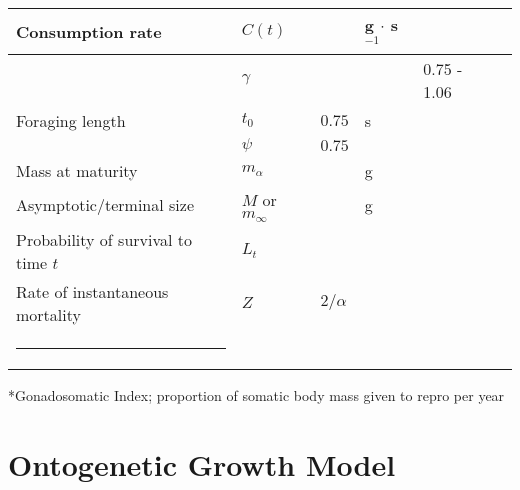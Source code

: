 \documentclass[a4paper]{article} %
\makeatletter
\newcommand{\thickhline}{%
    \noalign {\ifnum 0=`}\fi \hrule height 1pt
    \futurelet \reserved@a \@xhline
}
\makeatother
\begin{document}
\begin{table}[H]
\begin{tabularx}{\linewidth}{Xlllll}
    Consumption rate                            & $C(t)$                &                           & g $\cdot$ s$^{-1}$    &                                   &                       \\ \hline
                                                & $\gamma$              &                           & \textsc{}             & 0.75 - 1.06                       & \textcite{Pawar2012}      \\ \hline
    Foraging length                             & $t_0$                 & $0.75$                    & s                     &                                   &                       \\
                                                & $\psi$                & $0.75$                    &                       &                                   &                       \\ \hline
    Mass at maturity                            & $m_{\alpha}$          &                           & g                     &                                   &                       \\ \hline
    Asymptotic/terminal size                    & $M$ or $m_{\infty}$   &                           & g                     &                                   &                       \\ \hline
    Probability of survival to time $t$         & $L_t$                 &                           & \textsc{}             &                                   &                       \\ \hline
    Rate of instantaneous mortality             & $Z$                   & $2/\alpha$                &                       &                                   &                       \\ \thickhline
    \end{tabularx}
\end{table}
*Gonadosomatic Index; proportion of somatic body mass given to repro per year


\section{Ontogenetic Growth Model}
\end{document}
